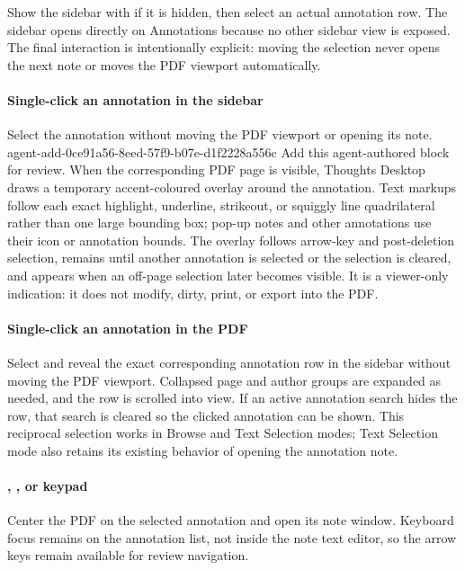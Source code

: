 Show the sidebar with  if it is hidden, then select an actual annotation row.
The sidebar opens directly on Annotations because no other sidebar view is exposed.
The final interaction is intentionally explicit: moving the selection never opens the next note or moves the PDF viewport automatically.

\paragraph{Single-click an annotation in the sidebar}
Select the annotation without moving the PDF viewport or opening its note.
\agentProposedEdit
  {agent-add-0ce91a56-8eed-57f9-b07e-d1f2228a556c}
  {Add this agent-authored block for review.}
  {}
  {When the corresponding PDF page is visible, Thoughts Desktop draws a temporary accent-coloured overlay around the annotation.}
Text markups follow each exact highlight, underline, strikeout, or squiggly line quadrilateral rather than one large bounding box; pop-up notes and other annotations use their icon or annotation bounds.
The overlay follows arrow-key and post-deletion selection, remains until another annotation is selected or the selection is cleared, and appears when an off-page selection later becomes visible.
It is a viewer-only indication: it does not modify, dirty, print, or export into the PDF.

\paragraph{Single-click an annotation in the PDF}
Select and reveal the exact corresponding annotation row in the sidebar without moving the PDF viewport.
Collapsed page and author groups are expanded as needed, and the row is scrolled into view.
If an active annotation search hides the row, that search is cleared so the clicked annotation can be shown.
This reciprocal selection works in Browse and Text Selection modes; Text Selection mode also retains its existing behavior of opening the annotation note.

\paragraph{, , or keypad }
Center the PDF on the selected annotation and open its note window.
Keyboard focus remains on the annotation list, not inside the note text editor, so the arrow keys remain available for review navigation.

